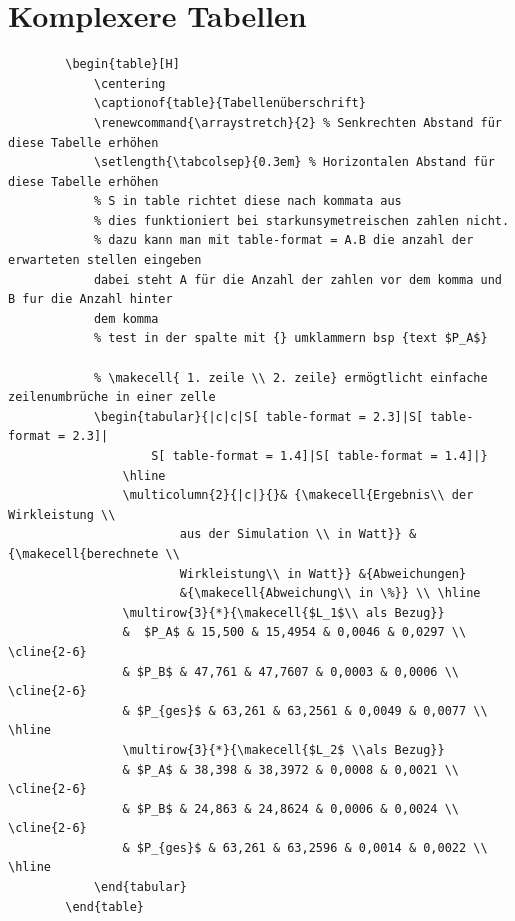 	\section{Komplexere Tabellen}
	\begin{verbatim}
		\begin{table}[H]
			\centering
			\captionof{table}{Tabellenüberschrift}
			\renewcommand{\arraystretch}{2} % Senkrechten Abstand für diese Tabelle erhöhen
			\setlength{\tabcolsep}{0.3em} % Horizontalen Abstand für diese Tabelle erhöhen
			% S in table richtet diese nach kommata aus
			% dies funktioniert bei starkunsymetreischen zahlen nicht.
			% dazu kann man mit table-format = A.B die anzahl der erwarteten stellen eingeben 
			dabei steht A für die Anzahl der zahlen vor dem komma und B fur die Anzahl hinter 
			dem komma
			% test in der spalte mit {} umklammern bsp {text $P_A$}
			
			% \makecell{ 1. zeile \\ 2. zeile} ermögtlicht einfache zeilenumbrüche in einer zelle
			\begin{tabular}{|c|c|S[ table-format = 2.3]|S[ table-format = 2.3]|
					S[ table-format = 1.4]|S[ table-format = 1.4]|}
				\hline
				\multicolumn{2}{|c|}{}& {\makecell{Ergebnis\\ der Wirkleistung \\ 
						aus der Simulation \\ in Watt}} & {\makecell{berechnete \\
						Wirkleistung\\ in Watt}} &{Abweichungen} 
					    &{\makecell{Abweichung\\ in \%}} \\ \hline
				\multirow{3}{*}{\makecell{$L_1$\\ als Bezug}} 
				&  $P_A$ & 15,500 & 15,4954 & 0,0046 & 0,0297 \\ \cline{2-6} 
				& $P_B$ & 47,761 & 47,7607 & 0,0003 & 0,0006 \\ \cline{2-6} 
				& $P_{ges}$ & 63,261 & 63,2561 & 0,0049 & 0,0077 \\ \hline
				\multirow{3}{*}{\makecell{$L_2$ \\als Bezug}}
				& $P_A$ & 38,398 & 38,3972 & 0,0008 & 0,0021 \\ \cline{2-6} 
				& $P_B$ & 24,863 & 24,8624 & 0,0006 & 0,0024 \\ \cline{2-6} 
				& $P_{ges}$ & 63,261 & 63,2596 & 0,0014 & 0,0022 \\ \hline
			\end{tabular}
		\end{table}
	\end{verbatim}
